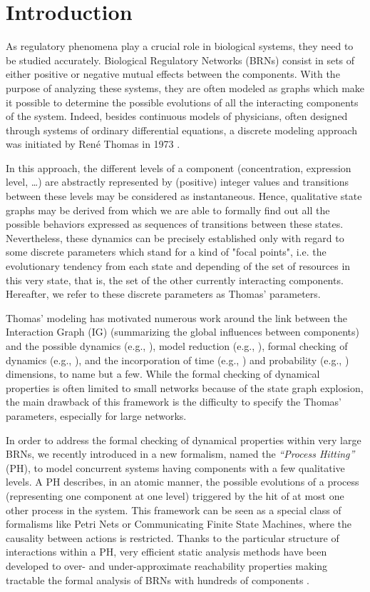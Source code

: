 \section{Introduction}
As regulatory phenomena play a crucial role in biological systems, they need to be studied accurately.
Biological Regulatory Networks (BRNs) consist in sets of either positive or negative mutual effects between the components.
With the purpose of analyzing these systems, they are often modeled as graphs which make it possible to determine the possible evolutions of all the interacting components of the system.
Indeed, besides continuous models of physicians, often designed through systems of ordinary
differential equations, a discrete modeling approach was initiated by René Thomas in 1973
\cite{Thomas73}.

In this approach, the different levels of a component (concentration, expression level, \ldots) are abstractly represented by (positive) integer values and transitions between these levels may be considered as instantaneous.
Hence, qualitative state graphs may be derived from which we are able to formally find out all the possible behaviors expressed as sequences of transitions between these states.
Nevertheless, these dynamics can be precisely established only with regard to some discrete parameters which stand for a kind of "focal points", i.e. the evolutionary tendency from each state and depending of the set of resources in this very state, that is, the set of the other currently interacting components.
Hereafter, we refer to these discrete parameters as Thomas' parameters.

Thomas' modeling has motivated numerous work around the link between the Interaction Graph (IG)
(summarizing the global influences between components) and the possible dynamics (e.g.,
\cite{RiCo07,RRT08}),
model reduction (e.g., \cite{Naldi09}), formal checking of dynamics (e.g., \cite{Richard06,Naldi07}), 
and the incorporation of time (e.g., \cite{Siebert06,Ahmad08}) and probability
(e.g., \cite{Twardziok10-CMSB}) dimensions, to name but a few.
While the formal checking of dynamical properties is often limited to small networks because of the
state graph explosion, the main drawback of this framework is the difficulty to specify the Thomas'
parameters, especially for large networks.

In order to address the formal checking of dynamical properties within very large BRNs, we recently
introduced in \cite{PMR10-TCSB} a new formalism, named the \emph{``Process Hitting''} (PH), to model
concurrent systems having components with a few qualitative levels.
A PH describes, in an atomic manner, the possible evolutions of a process (representing one
component at one level) triggered by the hit of at most one other process in the system.
This framework can be seen as a special class of formalisms like Petri Nets or Communicating Finite
State Machines, where the causality between actions is restricted.
Thanks to the particular structure of interactions within a PH, very efficient static analysis
methods have been developed to over- and under-approximate reachability properties making tractable
the formal analysis of BRNs with hundreds of components \cite{PMR12-MSCS}.

